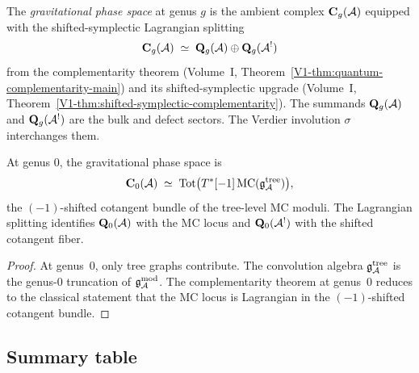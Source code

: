 \begin{definition}
The \emph{gravitational phase space} at genus $g$ is the ambient complex
$\mathbf{C}_g(\mathcal{A})$ equipped with the shifted-symplectic Lagrangian splitting
\begin{equation}%
\mathbf{C}_g(\cA) \;\simeq\; \mathbf{Q}_g(\cA) \oplus \mathbf{Q}_g(\cA^!)
\end{equation}
from the complementarity theorem (Volume~I, Theorem~\ref{V1-thm:quantum-complementarity-main})
and its shifted-symplectic upgrade
(Volume~I, Theorem~\ref{V1-thm:shifted-symplectic-complementarity}).
The summands $\mathbf{Q}_g(\mathcal{A})$ and $\mathbf{Q}_g(\mathcal{A}^!)$ are the bulk and defect
sectors. The Verdier involution $\sigma$ interchanges them.
\end{definition}

\begin{proposition}
At genus $0$, the gravitational phase space is
\begin{equation}%
\mathbf{C}_0(\cA)
\;\simeq\;
\operatorname{Tot}\bigl(
T^*[-1]\,\MC(\mathfrak{g}^{\mathrm{tree}}_\cA)
\bigr),
\end{equation}
the $(-1)$-shifted cotangent bundle of the tree-level MC moduli.
The Lagrangian splitting identifies $\mathbf{Q}_0(\mathcal{A})$ with the
MC locus and $\mathbf{Q}_0(\mathcal{A}^!)$ with the shifted cotangent
fiber.
\end{proposition}

\begin{proof}
At genus~$0$, only tree graphs contribute. The convolution algebra
$\mathfrak{g}^{\mathrm{tree}}_{\mathcal{A}}$ is the genus-$0$ truncation of
$\mathfrak{g}_{\mathcal{A}}^{\mathrm{mod}}$. The complementarity theorem at genus~$0$ reduces to the
classical statement that the MC locus is Lagrangian in the
$(-1)$-shifted cotangent bundle.
\end{proof}


\subsection{Summary table}

